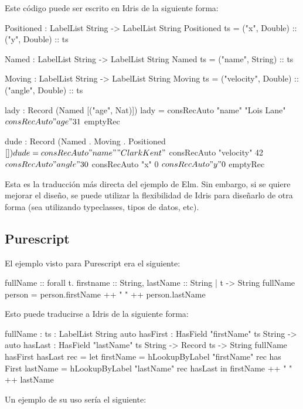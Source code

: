 Este código puede ser escrito en Idris de la siguiente forma:

\begin{code}
Positioned : LabelList String -> LabelList String
Positioned ts = ("x", Double) :: ("y", Double) :: ts

Named : LabelList String -> LabelList String
Named ts = ("name", String) :: ts

Moving : LabelList String -> LabelList String
Moving ts = ("velocity", Double) :: ("angle", Double) :: ts

lady : Record (Named [("age", Nat)])
lady = consRecAuto "name" "Lois Lane" $
  consRecAuto "age" 31 $
  emptyRec

dude : Record (Named . Moving . Positioned $ [])
dude = consRecAuto "name" "Clark Kent" $
  consRecAuto "velocity" 42 $
  consRecAuto "angle" 30 $
  consRecAuto "x" 0 $
  consRecAuto "y" 0 $
  emptyRec
\end{code}

Esta es la traducción más directa del ejemplo de Elm. Sin embargo, si se quiere mejorar el diseño, se puede utilizar la flexibilidad de Idris para diseñarlo de otra forma (sea utilizando typeclasses, tipos de datos, etc).

\subsection{Purescript}

El ejemplo visto para Purescript era el siguiente:

\begin{code}
fullName :: forall t. { firstname :: String,
  lastName :: String | t } -> String
fullName person = person.firstName ++ " " ++ person.lastName
\end{code}

Esto puede traducirse a Idris de la siguiente forma:

\begin{code}
fullName : {ts : LabelList String}
  {auto hasFirst : HasField "firstName" ts String} ->
  {auto hasLast : HasField "lastName" ts String} ->
  Record ts -> String
fullName {hasFirst} {hasLast} rec =
  let firstName = hLookupByLabel "firstName" rec has First
    lastName = hLookupByLabel "lastName" rec hasLast
  in firstName ++ " " ++ lastName
\end{code}

Un ejemplo de su uso sería el siguiente:


